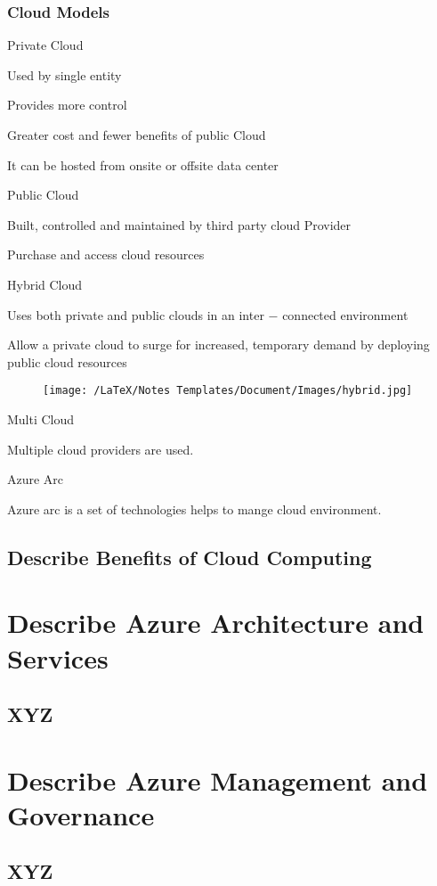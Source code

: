 \documentclass[12pt,a4paper]{report}
\begin{document}
\subsection{Cloud Models}
\begin{mylist1}
    \item Private Cloud
    \begin{mylist2}
        \item Used by single entity
        \item Provides more control
        \item Greater cost and fewer benefits of public Cloud
        \item It can be hosted from onsite or offsite data center
    \end{mylist2}
    \item Public Cloud
    \begin{mylist2}
        \item Built, controlled and maintained by third party cloud Provider
        \item Purchase and access cloud resources
    \end{mylist2}
    \item Hybrid Cloud
    \begin{mylist2}
        \item Uses both private and public clouds in an inter $-$ connected environment
        \item Allow a private cloud to surge for increased, temporary demand by deploying public cloud resources  
        \begin{figure}[!htpb]
            \centering
            \texttt{[image: /LaTeX/Notes Templates/Document/Images/hybrid.jpg]}
        \end{figure}
    \end{mylist2}
    \item Multi Cloud
    \begin{mylist2}
        \item Multiple cloud providers are used.
    \end{mylist2}
    \item Azure Arc
    \begin{mylist2}
        \item Azure arc is a set of technologies helps to mange cloud environment.
    \end{mylist2}
\end{mylist1}
\section{Describe Benefits of Cloud Computing}
\chapter{Describe Azure Architecture and Services}
\section{XYZ}
\chapter{Describe Azure Management and Governance}
\section{XYZ}
\end{document}

